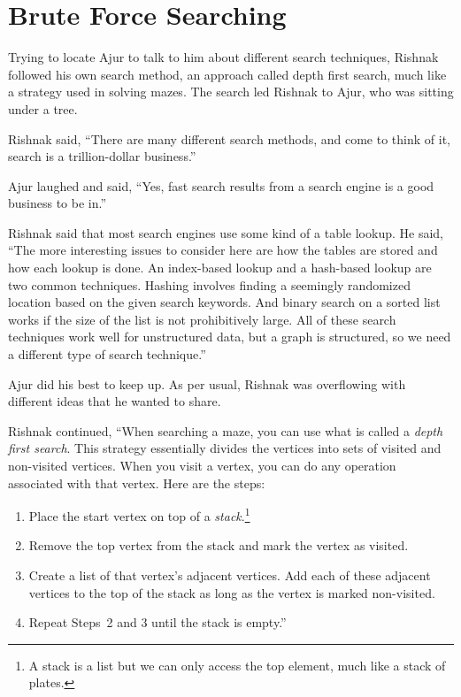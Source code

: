 \chapter{Brute Force Searching}

Trying to locate Ajur to talk to him about different search techniques, Rishnak followed his own search method, an approach called depth first search, much like a strategy used in solving mazes. The search led Rishnak to Ajur, who was sitting under a tree.

Rishnak said, ``There are many different search methods, and come to think of it, search is a trillion-dollar business.''

Ajur laughed and said, ``Yes, fast search results from a search engine is a good business to be in.''

Rishnak said that most search engines use some kind of a table lookup. He said, ``The more interesting issues to consider here are how the tables are stored and how each lookup is done.  An index-based lookup and a hash-based lookup are two common techniques.  Hashing involves finding a seemingly randomized location based on the given search keywords. And binary search on a sorted list works if the size of the list is not prohibitively large. All of these search techniques work well for unstructured data, but a graph is structured, so we need a different type of search technique.'' 

Ajur did his best to keep up. As per usual, Rishnak was overflowing with different ideas that he wanted to share.

Rishnak continued, ``When searching a maze, you can use what is called a \textit{depth first search}. This strategy essentially divides the vertices into sets of visited and non-visited vertices. When you visit a vertex, you can do any operation associated with that vertex. Here are the steps:

\begin{enumerate}
    \item Place the start vertex on top of a \textit{stack}.\footnote{A stack is a list but we can only access the top element, much like a stack of plates.}
     \item Remove the top vertex from the stack and mark the vertex as visited.
     \item Create a list of that vertex's adjacent vertices. Add each of these adjacent vertices to the top of the stack as long as the vertex is marked non-visited.
     \item Repeat Steps~2 and 3 until the stack is empty.''
\end{enumerate}

